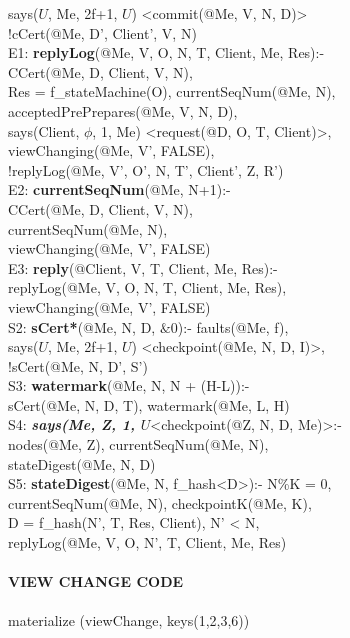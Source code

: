 \begin{code}
\> says($U$, Me, 2f+1, $U$) <commit(@Me, V, N, D)>\\
\> !cCert(@Me, D', Client', V, N)\\
E1: \textbf{replyLog}(@Me, V, O, N, T, Client, Me, Res):-\\
\> CCert(@Me, D, Client, V, N),\\
\> Res = f\_stateMachine(O), currentSeqNum(@Me, N),\\
\> acceptedPrePrepares(@Me, V, N, D),\\
\> says(Client, $\phi$, 1, Me) <request(@D, O, T, Client)>, \\
\> viewChanging(@Me, V', FALSE), \\
\> !replyLog(@Me, V', O', N, T', Client', Z, R')\\
E2: \textbf{currentSeqNum}(@Me, N+1):-\\
\> CCert(@Me, D, Client, V, N),\\
\> currentSeqNum(@Me, N), \\
\> viewChanging(@Me, V', FALSE)\\
E3: \textbf{reply}(@Client, V, T, Client, Me, Res):-\\
\> replyLog(@Me, V, O, N, T, Client, Me, Res),\\
\> viewChanging(@Me, V', FALSE)\\
S2: \textbf{sCert*}(@Me, N, D, $\&0$):- faults(@Me, f),\\
\> says($U$, Me, 2f+1, $U$) <checkpoint(@Me, N, D, I)>, \\
\> !sCert(@Me, N, D', S')\\
S3: \textbf{watermark}(@Me, N, N + (H-L)):- \\
\> sCert(@Me, N, D, T), watermark(@Me, L, H)\\
S4: \textbf{\textit{says(Me, Z, 1, $U$}}<checkpoint(@Z, N, D, Me)>:-\\
\> nodes(@Me, Z), currentSeqNum(@Me, N), \\
\> stateDigest(@Me, N, D)\\
S5: \textbf{stateDigest}(@Me, N, f\_hash<D>):- N\%K = 0,\\
\> currentSeqNum(@Me, N), checkpointK(@Me, K), \\
\> D = f\_hash(N', T, Res, Client), N' < N,\\
\> replyLog(@Me, V, O, N', T, Client, Me, Res)\\
\\
{\bf VIEW CHANGE CODE}\\
\\
materialize (viewChange, keys(1,2,3,6))\\

\end{code}

